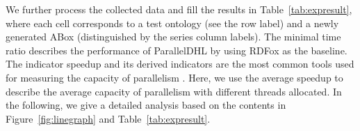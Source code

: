 
We further process the collected data and fill the results in Table~\ref{tab:expresult}, where each cell corresponds
to a test ontology (see the row label) and a newly generated ABox
(distinguished by the series column labels). 
The minimal time ratio describes the performance of ParallelDHL by using RDFox as the baseline.
The indicator speedup and its derived indicators are the most common tools used for measuring the capacity of parallelism \cite{MotikNPHO14,KazakovKS14,UrbaniKMHB12}.
Here, we use the average speedup \cite{ichiyoshiK92} to describe the average capacity of parallelism with different
threads allocated.
In the following, we give a detailed analysis based on the contents in Figure~\ref{fig:linegraph} and Table~\ref{tab:expresult}.

